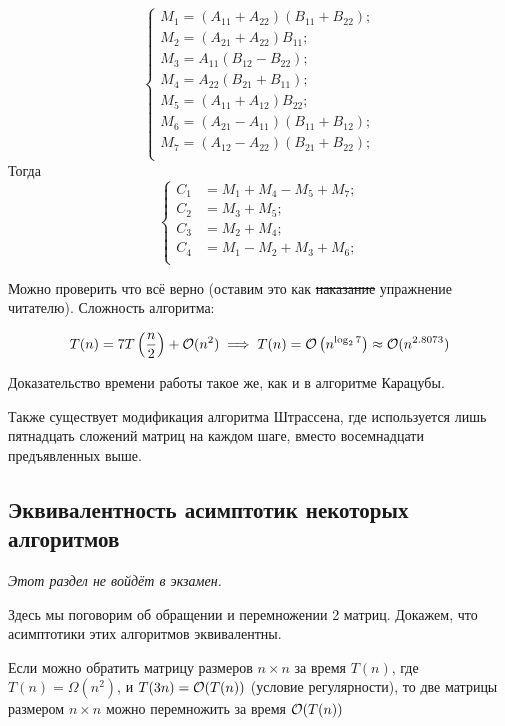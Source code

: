 \[\begin{cases}
    M_1 = (A_{11} + A_{22})(B_{11} + B_{22}); \\
    M_2 = (A_{21} + A_{22})B_{11}; \\
    M_3 = A_{11}(B_{12} - B_{22}); \\
    M_4 = A_{22}(B_{21} + B_{11}); \\
    M_5 = (A_{11} + A_{12})B_{22}; \\
    M_6 = (A_{21} - A_{11})(B_{11} + B_{12}); \\
    M_7 = (A_{12} - A_{22})(B_{21} + B_{22}); \\
\end{cases}\]
Тогда
\[\begin{cases}
    C_1 &= M_1+M_4-M_5+M_7; \\
    C_2 &= M_3+M_5; \\
    C_3 &= M_2+M_4; \\
    C_4 &= M_1-M_2+M_3+M_6; \\
\end{cases}\]

Можно проверить что всё верно (оставим это как \sout{наказание} упражнение читателю). Сложность алгоритма:

\[T(n) = 7T\left( \frac{n}{2} \right) + \mathcal{O}(n^2) \implies T(n) = \mathcal{O}\left(n^{\log_{2} 7} \right) \approx \mathcal{O}(n^{2.8073})\]

Доказательство времени работы такое же, как и в алгоритме Карацубы.

Также существует модификация алгоритма Штрассена, где используется лишь
пятнадцать
сложений матриц на каждом шаге, вместо восемнадцати предъявленных выше.

\subsection{Эквивалентность асимптотик некоторых алгоритмов}

\emph{Этот раздел не войдёт в экзамен.}

Здесь мы поговорим об обращении и перемножении 2 матриц. Докажем, что асимптотики
этих алгоритмов эквивалентны.

\begin{Theorem}
  Если можно обратить матрицу размеров $n \times n$ за время $T(n)$,
  где $T(n) = \Omega(n^2)$, и $T(3n) = \mathcal{O}(T(n))$ (условие регулярности), то две
  матрицы размером $n \times n$ можно перемножить за время $\mathcal{O}(T(n))$
\end{Theorem}

